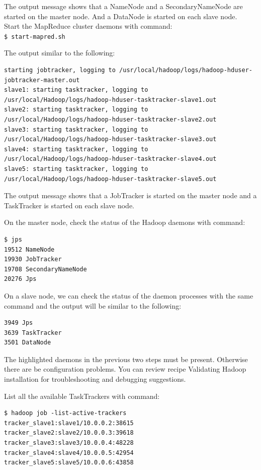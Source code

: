 The output message shows that a NameNode and a SecondaryNameNode are started on the master node. And a DataNode is started on each slave node. \\
Start the MapReduce cluster daemons with command: \\
\verb|$ start-mapred.sh|

The output similar to the following:
\begin{verbatim}
starting jobtracker, logging to /usr/local/hadoop/logs/hadoop-hduser-jobtracker-master.out
slave1: starting tasktracker, logging to /usr/local/Hadoop/logs/hadoop-hduser-tasktracker-slave1.out
slave2: starting tasktracker, logging to /usr/local/Hadoop/logs/hadoop-hduser-tasktracker-slave2.out
slave3: starting tasktracker, logging to /usr/local/Hadoop/logs/hadoop-hduser-tasktracker-slave3.out
slave4: starting tasktracker, logging to /usr/local/Hadoop/logs/hadoop-hduser-tasktracker-slave4.out
slave5: starting tasktracker, logging to /usr/local/Hadoop/logs/hadoop-hduser-tasktracker-slave5.out
\end{verbatim}

The output message shows that a JobTracker is started on the master node and a TaskTracker is started on each slave node.

On the master node, check the status of the Hadoop daemons with command:
\begin{verbatim}
$ jps
19512 NameNode
19930 JobTracker
19708 SecondaryNameNode
20276 Jps
\end{verbatim}

On a slave node, we can check the status of the daemon processes with the same command and the output will be similar to the following:
\begin{verbatim}
3949 Jps
3639 TaskTracker
3501 DataNode
\end{verbatim}

The highlighted daemons in the previous two steps must be present. Otherwise there are be configuration problems. You can review recipe Validating Hadoop installation for troubleshooting and debugging suggestions.

List all the available TaskTrackers with command:
\begin{verbatim}
$ hadoop job -list-active-trackers
tracker_slave1:slave1/10.0.0.2:38615
tracker_slave2:slave2/10.0.0.3:39618
tracker_slave3:slave3/10.0.0.4:48228
tracker_slave4:slave4/10.0.0.5:42954
tracker_slave5:slave5/10.0.0.6:43858
\end{verbatim}

